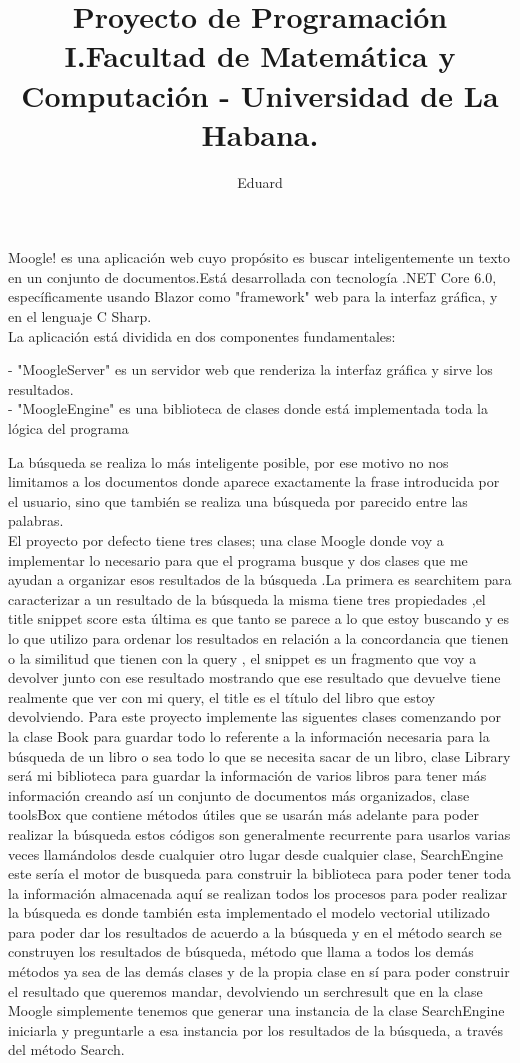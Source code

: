 \documentclass[a4paper,12pt]{article}
\author{Eduard}
\title{Proyecto de Programación I.Facultad de Matemática y Computación - Universidad de La Habana.}
\begin{document}
\maketitle
Moogle! es una aplicaci\'on web cuyo prop\'osito es buscar inteligentemente un
texto en un conjunto de documentos.Est\'a desarrollada con tecnolog\'ia .NET Core 6.0,
específicamente usando Blazor como "framework" web para la interfaz gr\'afica, y en el lenguaje C Sharp.\\
 La aplicación está dividida en dos componentes fundamentales:

- "MoogleServer" es un servidor web que renderiza la interfaz gr\'afica y sirve los resultados.\\
- "MoogleEngine" es una biblioteca de clases donde está implementada toda la l\'ogica del programa

La b\'usqueda se realiza lo m\'as inteligente posible, por ese motivo no nos limitamos a 
los documentos donde aparece exactamente la frase introducida por el usuario, sino que tambi\'en se realiza una b\'usqueda por parecido entre las palabras.\\
 

El proyecto por defecto tiene tres clases; una clase Moogle donde voy a implementar lo necesario para
que el programa busque y dos clases que me ayudan a organizar esos resultados de la búsqueda .La
primera es searchitem para caracterizar a un resultado de la búsqueda la misma tiene tres
propiedades ,el title snippet score esta última es que tanto se parece a lo que estoy buscando y es lo que 
utilizo para ordenar los resultados en relación a la concordancia que tienen o la similitud que tienen con
la query , el snippet es un fragmento que voy a devolver junto con ese resultado mostrando que ese
resultado que devuelve tiene realmente que ver con mi query, el title es el título del libro que estoy
devolviendo.
Para este proyecto implemente las siguentes clases comenzando por la clase Book  para guardar todo lo
referente a la información necesaria para la búsqueda de un libro o sea todo lo que se necesita sacar de
un libro, clase Library será mi biblioteca para guardar la información de varios libros para tener más
información creando así un conjunto de documentos más organizados, clase toolsBox que contiene
métodos útiles que se usarán más adelante para poder realizar la búsqueda estos códigos son
generalmente recurrente para usarlos varias veces llamándolos desde cualquier otro lugar desde
cualquier clase, SearchEngine este sería el motor de busqueda para construir la biblioteca para poder
tener toda la información almacenada aquí se realizan todos los procesos para poder realizar la
búsqueda es donde también esta implementado el modelo vectorial utilizado para poder dar los
resultados de acuerdo a la búsqueda y en el método search se construyen los resultados de búsqueda,
método que llama a todos los demás métodos ya sea de las demás clases y de la propia clase en sí para
poder construir el resultado que queremos mandar, devolviendo un serchresult que en la clase Moogle
simplemente tenemos que generar una instancia de la clase SearchEngine iniciarla y preguntarle a esa
instancia por los resultados de la búsqueda, a través del método Search.\\
\end{document}
